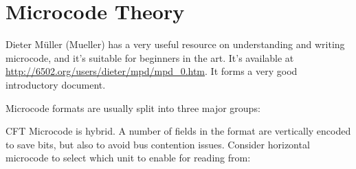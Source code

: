 
\section{Microcode Theory}

Dieter Müller (Mueller) has a very useful resource on understanding
and writing microcode, and it's suitable for beginners in the
art. It's available at
\url{http://6502.org/users/dieter/mpd/mpd_0.htm}. It forms a very good
introductory document.

Microcode formats are usually split into three major groups:


CFT Microcode is hybrid. A number of fields in the format are
vertically encoded to save bits, but also to avoid bus contention
issues. Consider horizontal microcode to select which unit to enable
for reading from:


